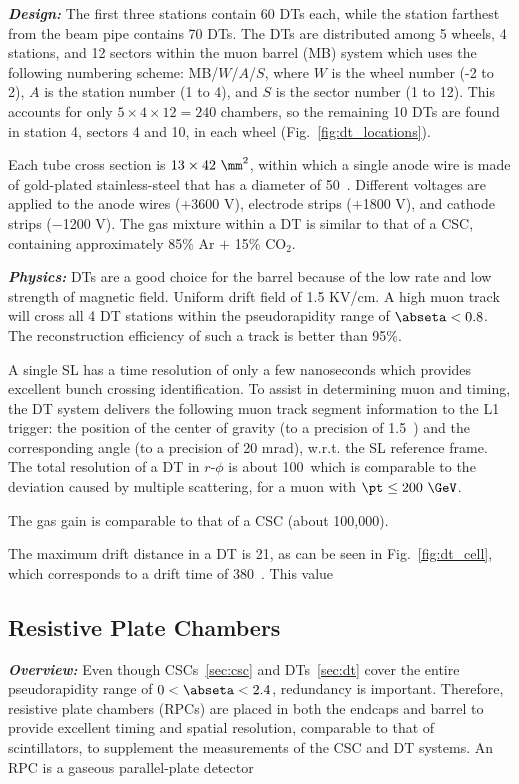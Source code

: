 \textbf{\textit{Design:}}
The first three stations contain 60 DTs each, while the station farthest from the beam pipe contains 70 DTs.
The DTs are distributed among 5 wheels, 4 stations, and 12 sectors within the muon barrel (MB) system which uses the following numbering scheme:
MB/$W$/$A$/$S$,
where $W$ is the wheel number (-2 to 2),
$A$ is the station number (1 to 4),
and $S$ is the sector number (1 to 12).
This accounts for only $5 \times 4 \times 12 = 240$ chambers, so the remaining 10 DTs are found in station 4, sectors 4 and 10, in each wheel (Fig.~\ref{fig:dt_locations}).

Each tube cross section is $13 \times 42~\mm^{2}$, within which a single anode wire is made of gold-plated stainless-steel that has a diameter of 50~\mum.
Different voltages are applied to the anode wires ($+$3600 V), electrode strips ($+$1800 V), and cathode strips ($-$1200 V).
The gas mixture within a DT is similar to that of a CSC, containing approximately 85\% Ar $+$ 15\% CO$_{2}$.

\textbf{\textit{Physics:}}
DTs are a good choice for the barrel because of the low rate and low strength of magnetic field.
Uniform drift field of 1.5 KV/cm.
A high \pt muon track will cross all 4 DT stations within the pseudorapidity range of $\abseta < 0.8$.
The reconstruction efficiency of such a track is better than 95\%.

A single SL has a time resolution of only a few nanoseconds which provides excellent bunch crossing identification.
To assist in determining muon \pt and timing, the DT system delivers the following muon track segment information to the L1 trigger:
the position of the center of gravity (to a precision of 1.5~\mm) and the corresponding angle (to a precision of 20 mrad), w.r.t. the SL reference frame.
The total resolution of a DT in $r$-$\phi$ is about 100~\mum which is comparable to the deviation caused by multiple scattering, for a muon with $\pt \le 200~\GeV$.

The gas gain is comparable to that of a CSC (about 100,000).

The maximum drift distance in a DT is 21\mm, as can be seen in Fig.~\ref{fig:dt_cell}, which corresponds to a drift time of 380~\ns.
This value 

\subsection{Resistive Plate Chambers}
\label{sec:rpc}

\textbf{\textit{Overview:}}
Even though CSCs~\ref{sec:csc} and DTs~\ref{sec:dt} cover the entire pseudorapidity range of $0 < \abseta < 2.4$, redundancy is important.
Therefore, resistive plate chambers (RPCs) are placed in both the endcaps and barrel to provide excellent timing and spatial resolution, comparable to that of scintillators, to supplement the measurements of the CSC and DT systems.
An RPC is a gaseous parallel-plate detector

